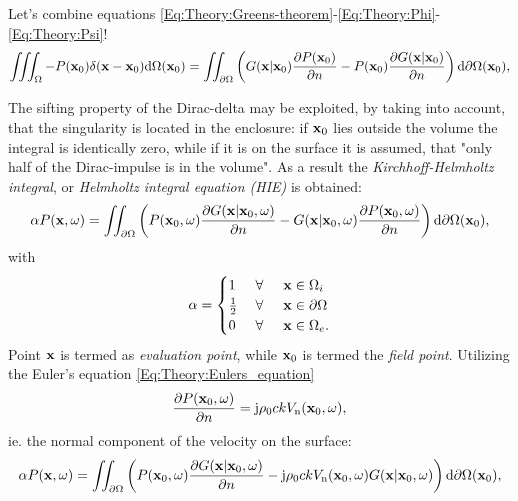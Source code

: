 Let's combine equations \eqref{Eq:Theory:Greens-theorem}-\eqref{Eq:Theory:Phi}-\eqref{Eq:Theory:Psi}!
\begin{equation}
\iiint_{\Omega} - P(\mathbf{x}_0) \delta(\mathbf{x} - \mathbf{x}_0)
  \mathrm{d} \Omega(\mathbf{x}_0) = 
\iint_{\partial \Omega}  \left(  G(\mathbf{x}|\mathbf{x}_0) \frac{\partial P(\mathbf{x}_0)}{\partial n}  - P(\mathbf{x}_0)  \frac{\partial G(\mathbf{x}|\mathbf{x}_0)}{\partial n}  \right)   \mathrm{d} \partial \Omega ( \mathbf{x}_0),
\end{equation}

The sifting property of the Dirac-delta may be exploited, by taking into account, that the singularity is located in the enclosure: if $\mathbf{x}_0$ lies outside the volume the integral is identically zero, while if it is on the surface it is assumed, that "only half of the Dirac-impulse is in the volume". As a result the \emph{Kirchhoff-Helmholtz integral}, or \emph{Helmholtz integral equation (HIE)} is obtained:
\begin{equation}
\alpha P(\mathbf{x},\omega) = 
\iint_{\partial \Omega}  \left( 
P(\mathbf{x}_0,\omega)  \frac{\partial G(\mathbf{x}|\mathbf{x}_0,\omega)}{\partial n}  -  
G(\mathbf{x}|\mathbf{x}_0,\omega) \frac{\partial P(\mathbf{x}_0,\omega)}{\partial n} 
\right)   \mathrm{d} \partial \Omega ( \mathbf{x}_0),
\label{Eq:Theory:Kirchhoff-Helmholtz}
\end{equation}
with
\begin{equation*}
\alpha = \begin{cases} 
1           & \hspace{1mm} \forall \hspace{5mm}  \mathbf{x} \in \Omega_i  	   \\
\frac{1}{2} & \hspace{1mm} \forall \hspace{5mm}  \mathbf{x} \in \partial \Omega  \\
0 			& \hspace{1mm} \forall \hspace{5mm}  \mathbf{x} \in \Omega_e.
\end{cases}
\end{equation*}
Point $\mathbf{x}$ is termed as \emph{evaluation point}, while $\mathbf{x}_0$ is termed the \emph{field point}. Utilizing the Euler's equation \eqref{Eq:Theory:Eulers_equation}
\begin{equation}
\frac{\partial P(\mathbf{x}_0,\omega)}{\partial n} = \mathrm{j} \rho_0 c k V_{\mathrm{n}}(\mathbf{x}_0,\omega),
\end{equation}
ie. the normal component of the velocity on the surface:
\begin{equation}
\alpha P(\mathbf{x},\omega) = 
\iint_{\partial \Omega}  \left(  
P(\mathbf{x}_0,\omega)  \frac{\partial G(\mathbf{x}|\mathbf{x}_0,\omega)}{\partial n}  -
\mathrm{j} \rho_0 c k V_{\mathrm{n}}(\mathbf{x}_0,\omega) G(\mathbf{x}|\mathbf{x}_0,\omega) 
\right)   \mathrm{d} \partial \Omega ( \mathbf{x}_0),
\label{Eq:Theory:Kirchhoff}
\end{equation}

